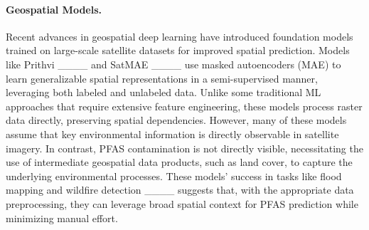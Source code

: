 \paragraph{Geospatial Models.}
Recent advances in geospatial deep learning have introduced foundation models trained on large-scale satellite datasets for improved spatial prediction. Models like Prithvi ____ and SatMAE ____ use masked autoencoders (MAE) to learn generalizable spatial representations in a semi-supervised manner, leveraging both labeled and unlabeled data. Unlike some traditional ML approaches that require extensive feature engineering, these models process raster data directly, preserving spatial dependencies. 
However, many of these models assume that key environmental information is directly observable in satellite imagery. In contrast, PFAS contamination is not directly visible, necessitating the use of intermediate geospatial data products, such as land cover, to capture the underlying environmental processes. These models' success in tasks like flood mapping and wildfire detection ____ suggests that, with the appropriate data preprocessing, they can leverage broad spatial context for PFAS prediction while minimizing manual effort.

